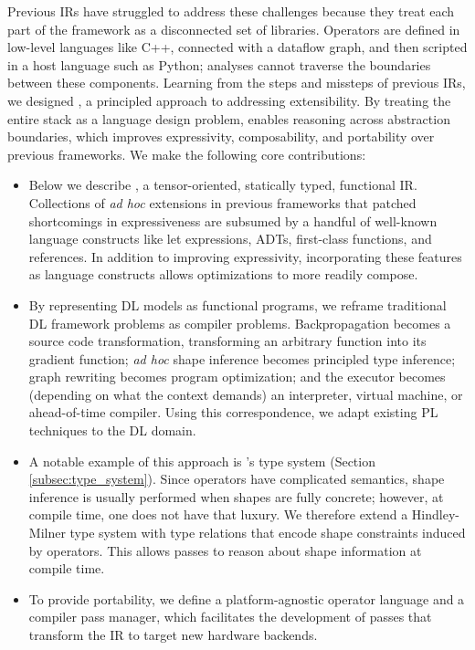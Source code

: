 Previous IRs have struggled to address these challenges because they treat
  each part of the framework as a disconnected set of libraries.
Operators are defined in low-level languages like C++,
  connected with a dataflow graph, and then scripted
  in a host language such as Python;
  analyses cannot traverse the boundaries between these components.
Learning from the steps and missteps of previous IRs, we designed \relay,
  a principled approach to addressing extensibility.
By treating the entire stack as a language
  design problem, \relay enables reasoning across
  abstraction boundaries, which
  improves expressivity, composability, and portability over previous frameworks.
We make the following core contributions:
\begin{itemize}
  \item
  Below we describe \relay, a tensor-oriented, statically typed,
    functional IR.
  Collections of \textit{ad hoc} extensions in previous frameworks
    that patched shortcomings in expressiveness are subsumed by a handful of well-known language
    constructs like let expressions, ADTs, first-class functions, and references.
  In addition to improving expressivity,
    incorporating these features as language constructs
    allows optimizations to more readily compose.
  \item
  By representing DL models as functional programs, we reframe traditional
    DL framework problems as compiler problems.
  Backpropagation becomes a source code transformation,
    transforming an arbitrary \relay function into its gradient function;
    \textit{ad hoc} shape inference becomes principled type inference;
    graph rewriting becomes program optimization;
    and the executor becomes (depending on what the context demands) an
    interpreter, virtual machine, or ahead-of-time compiler.
  Using this correspondence, we adapt existing
    PL techniques to the DL domain.
  \item
    A notable example of this approach is \relay's type system (Section \ref{subsec:type_system}).
    Since operators have complicated semantics, shape inference is usually
      performed when shapes are fully concrete;
      however, at compile time, one does not have that luxury.
    We therefore extend a Hindley-Milner type system with type relations that encode shape
      constraints induced by operators.
    This allows \relay passes to reason about shape information at compile time.
  \item To provide portability,
    we define a platform-agnostic operator language
    and a compiler pass manager, which facilitates the development of
    passes that transform the IR to target new hardware backends.
\end{itemize}

